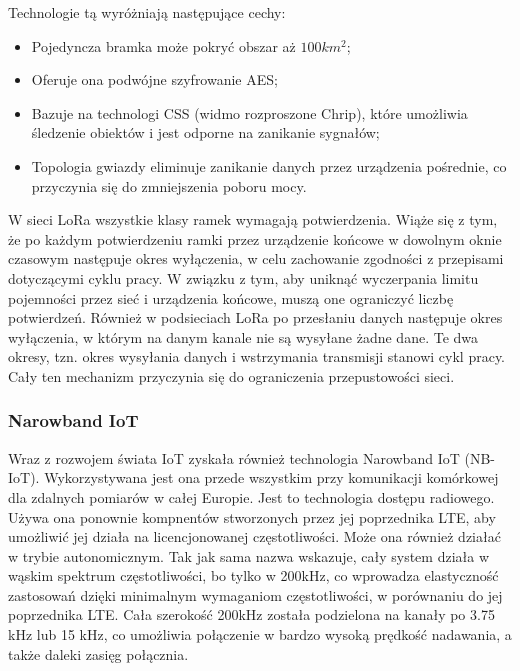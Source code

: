 Technologie tą wyróżniają następujące cechy:
\begin{itemize}
  \setlength\itemsep{1mm} %
  \item Pojedyncza bramka może pokryć obszar aż $100km^2$;
  \item Oferuje ona podwójne szyfrowanie AES;
  \item Bazuje na technologi CSS (widmo rozproszone Chrip), które umożliwia śledzenie obiektów i jest odporne na zanikanie sygnałów;
  \item Topologia gwiazdy eliminuje zanikanie danych przez urządzenia pośrednie, co przyczynia się do zmniejszenia poboru mocy. \cite{LoRa-article}
\end{itemize}


W sieci LoRa wszystkie klasy ramek wymagają potwierdzenia. Wiąże się z tym, że po każdym potwierdzeniu ramki przez urządzenie końcowe w dowolnym oknie czasowym następuje okres wyłączenia, w celu zachowanie zgodności z przepisami dotyczącymi cyklu pracy. W związku z tym, aby uniknąć wyczerpania limitu pojemności przez sieć i urządzenia końcowe, muszą one ograniczyć liczbę potwierdzeń. Również w podsieciach LoRa po przesłaniu danych następuje okres wyłączenia, w którym na danym kanale nie są wysyłane żadne dane. Te dwa okresy, tzn. okres wysyłania danych i wstrzymania transmisji stanowi cykl pracy. Cały ten mechanizm przyczynia się do ograniczenia przepustowości sieci.\cite{LoRa-article}

\subsubsection{Narowband IoT}
Wraz z rozwojem świata IoT zyskała również technologia Narowband IoT (NB-IoT). Wykorzystywana jest ona przede wszystkim przy komunikacji komórkowej dla zdalnych pomiarów w całej Europie. Jest to technologia dostępu radiowego. Używa ona ponownie kompnentów stworzonych przez jej poprzednika LTE, aby umożliwić jej działa na licencjonowanej częstotliwości. Może ona również działać w trybie autonomicznym. Tak jak sama nazwa wskazuje, cały system działa w wąskim spektrum częstotliwości, bo tylko w 200kHz, co wprowadza elastyczność zastosowań dzięki minimalnym wymaganiom częstotliwości, w porównaniu do jej poprzednika LTE. Cała szerokość 200kHz została podzielona na kanały po 3.75 kHz lub 15 kHz, co umożliwia połączenie w bardzo wysoką prędkość nadawania, a także daleki zasięg połącznia. \cite{nbiot-article}  

